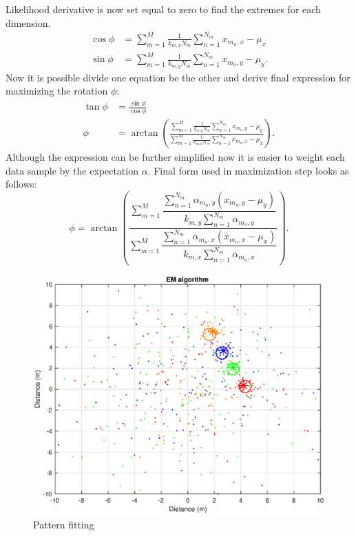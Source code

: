 Likelihood derivative is now set equal to zero to find the extremes for each dimension.
\begin{align}
\cos \phi &= \sum_{m=1}^{M} \frac{1}{k_{m, x}N_m} \sum_{n = 1}^{N_m} x_{m_n, x} - \mu_x \\ 
\sin \phi &= \sum_{m=1}^{M} \frac{1}{k_{m, y}N_m} \sum_{n = 1}^{N_m} x_{m_n, y} - \mu_y .
\end{align}
Now it is possible divide one equation be the other and derive final expression for maximizing the rotation $\phi$:
\begin{align}
\tan \phi &= \frac{\sin \phi}{\cos \phi}\\
\phi &= \arctan \left( \frac{\sum_{m=1}^{M} \frac{1}{k_{m, y}N_m} \sum_{n = 1}^{N_m} x_{m_n, y} - \mu_y }{\sum_{m=1}^{M} \frac{1}{k_{m, x}N_m} \sum_{n = 1}^{N_m} x_{m_n, x} - \mu_x }\right).
\end{align}
Although the expression can be further simplified now it is easier to weight each data sample by the expectation $\alpha$. Final form used in maximization step looks as follows:
\begin{equation}
\phi = \arctan \left( \dfrac{\sum_{m=1}^{M} \dfrac{\sum_{n = 1}^{N_m} \alpha_{m_n, y}(x_{m_n, y} - \mu_y)}{k_{m, y}\sum_{n = 1}^{N_m} \alpha_{m_n, y}} }{\sum_{m=1}^{M} \dfrac{\sum_{n = 1}^{N_m} \alpha_{m_n, x} (x_{m_n, x} - \mu_x) }{k_{m, x}\sum_{n = 1}^{N_m} \alpha_{m_n, x}} }\right).
\end{equation}
\begin{figure}[H]
\centering
\includegraphics[scale=0.55]{fig/em_blobs.eps}
\caption[Pattern fitting with EM algorithm]{Pattern fitting}
\label{fig:em_blobs}
\end{figure}

